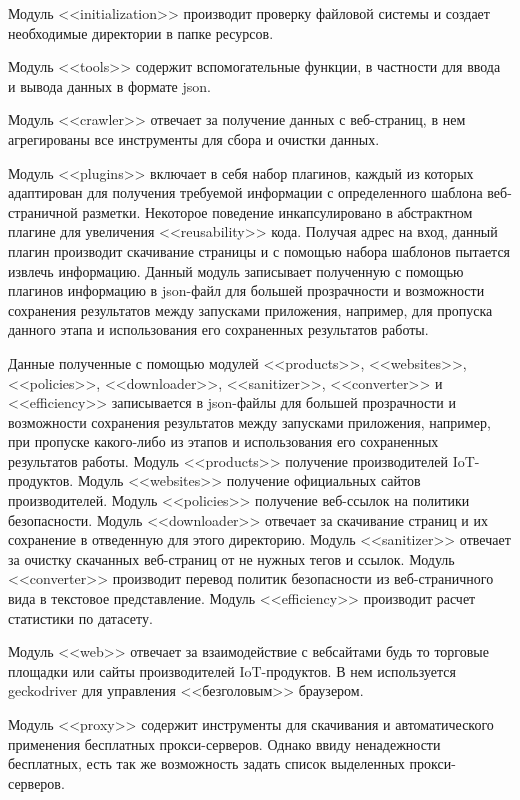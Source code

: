 \documentclass[../main]{subfiles}
\begin{document}
Модуль <<initialization>> производит проверку файловой системы и создает необходимые директории в папке ресурсов.

Модуль <<tools>> содержит вспомогательные функции, в частности для ввода и вывода данных в формате json. 

Модуль <<crawler>> отвечает за получение данных с веб-страниц, в нем агрегированы все инструменты для сбора и очистки данных. 

Модуль <<plugins>> включает в себя набор плагинов, каждый из которых адаптирован для получения требуемой информации с определенного шаблона веб-страничной разметки. Некоторое поведение инкапсулировано в абстрактном плагине для увеличения <<reusability>> кода. Получая адрес на вход, данный плагин производит скачивание страницы и с помощью набора шаблонов пытается извлечь информацию. Данный модуль записывает полученную с помощью плагинов информацию в json-файл для большей прозрачности и возможности сохранения результатов между запусками приложения, например, для пропуска данного этапа и использования его сохраненных результатов работы. 

Данные полученные с помощью модулей <<products>>, <<websites>>, <<policies>>, <<downloader>>, <<sanitizer>>, <<converter>> и <<efficiency>> записывается в json-файлы для большей прозрачности и возможности сохранения результатов между запусками приложения, например, при пропуске какого-либо из этапов и использования его сохраненных результатов работы. Модуль <<products>> получение производителей IoT-продуктов. Модуль <<websites>> получение официальных сайтов производителей. Модуль <<policies>> получение веб-ссылок на политики безопасности. Модуль <<downloader>> отвечает за скачивание страниц и их сохранение в отведенную для этого директорию. Модуль <<sanitizer>> отвечает за очистку скачанных веб-страниц от не нужных тегов и ссылок. Модуль <<converter>> производит перевод политик безопасности из веб-страничного вида в текстовое представление. Модуль <<efficiency>> производит расчет статистики по датасету.

Модуль <<web>> отвечает за взаимодействие с вебсайтами будь то торговые площадки или сайты производителей IoT-продуктов. В нем используется geckodriver для управления <<безголовым>> браузером. 

Модуль <<proxy>> содержит инструменты для скачивания и автоматического применения бесплатных прокси-серверов. Однако ввиду ненадежности бесплатных, есть так же возможность задать список выделенных прокси-серверов. 
\end{document}
